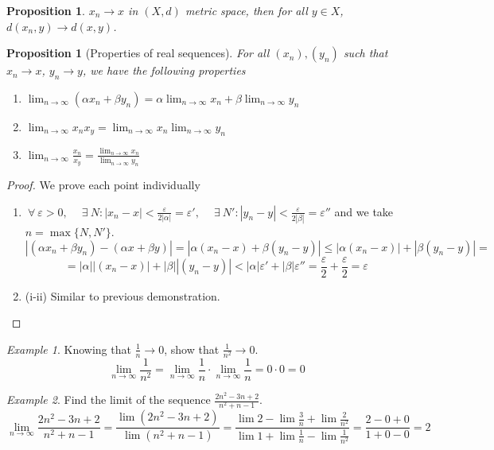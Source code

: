 \documentclass{article}
\newcommand{\DS}{\displaystyle}
\newcommand{\abs}[1]{\left|#1\right|}
\newenvironment{enumrom}{\begin{enumerate}[label=(\roman*)]}{\end{enumerate}}
\newcommand{\fr}[2]{\frac{#1}{#2}}
\newcommand{\limn}{\lim_{n \to \infty}}
\theoremstyle{definition}
\theoremstyle{definition}
\theoremstyle{plain}
\theoremstyle{plain}
\theoremstyle{plain}
\theoremstyle{plain}
\newtheorem{proposition}[theorem]{Proposition}
\theoremstyle{definition}
\theoremstyle{remark}
\theoremstyle{remark}
\theoremstyle{remark}
\newtheorem{examplet}{Example}[theorem]
\theoremstyle{remark}
\newcommand{\ForAll}{\ \forall \ }
\newcommand{\Exists}{\ \exists \ }
\newcommand{\E}{\varepsilon}
\begin{document}
\begin{proposition}
  $x_n \to x$ in $(X,d)$ metric space, then for all $y \in X$, $d(x_n,y) \to d(x,y)$.
\end{proposition}


\begin{proposition}[Properties of real sequences]
  For all $(x_n), (y_n)$ such that $x_n \to x$, $y_n \to y$, we have the following properties
  \begin{enumrom}
  \item $\DS \limn (\alpha x_n + \beta y_n) = \alpha \limn x_n + \beta \limn y_n$
  \item $\DS \limn x_n x_y = \limn x_n \limn y_n$
  \item $\DS \limn \fr{x_n}{x_y} = \fr{\limn x_n}{\limn y_n}$
  \end{enumrom}
\end{proposition}

\begin{proof} We prove each point individually
  \begin{enumrom}
  \item $\DS \ForAll \E > 0, \quad \Exists N : \abs{x_n - x} < \fr{\E}{2\abs{\alpha}} = \E', \quad \Exists N' : \abs{y_n - y} < \fr{\E}{2\abs{\beta}} = \E'' $ and we take $ n = \max \{ N, N'\} $.
    \[
    \abs{(\alpha x_n + \beta y_n) - (\alpha x + \beta y)} =
    \abs{\alpha (x_n - x) + \beta (y_n - y)} \leq
    \abs{\alpha (x_n - x)} + \abs{\beta (y_n - y)} =
    \]
    \[ =
    \abs{\alpha} \abs{(x_n - x)} + \abs{\beta} \abs{(y_n - y)} <
    \abs{\alpha} \E' + \abs{\beta} \E'' =
    \fr{\E}{2} + \fr{\E}{2} =
    \E
    \]
  \item[(i-ii)] Similar to previous demonstration.
  \end{enumrom}
\end{proof}

\begin{examplet}
  Knowing that $\fr{1}{n} \to 0$, show that $\fr{1}{n^2} \to 0$.
  \[
  \limn \fr{1}{n^2} = \limn \fr{1}{n} \cdot \limn \fr{1}{n} = 0 \cdot 0 = 0
  \]
\end{examplet}

\begin{examplet}
  Find the limit of the sequence $\fr{2n^2 - 3n + 2}{n^2 + n -1}$.
  \[
  \limn \fr{2n^2 - 3n + 2}{n^2 + n -1} =
  \fr{\lim (2n^2 - 3n + 2)}{\lim (n^2 + n -1)} =
  \fr{\lim 2 - \lim \fr{3}{n} + \lim \fr{2}{n^2}}{\lim 1 +
    \lim \fr{1}{n} - \lim \fr{1}{n^2}} =
  \fr{2 - 0 + 0}{1 + 0 - 0} = 2
  \]
\end{examplet}
\end{document}
